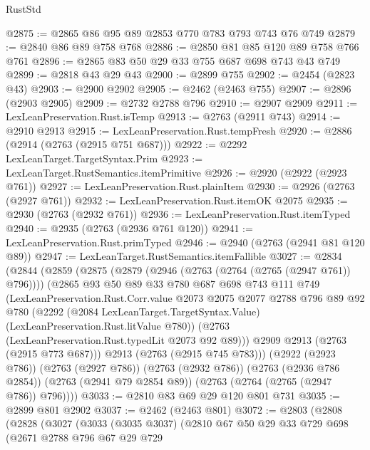 \begin{lexlean}{RustStd}
\begin{coremodule}
@2875 := @2865 @86 @95 @89 @2853 @770 @783 @793 @743 @76 @749
@2879 := @2840 @86 @89 @758 @768
@2886 := @2850 @81 @85 @120 @89 @758 @766 @761
@2896 := @2865 @83 @50 @29 @33 @755 @687 @698 @743 @43 @749
@2899 := @2818 @43 @29 @43
@2900 := @2899 @755
@2902 := @2454 (@2823 @43)
@2903 := @2900 @2902
@2905 := @2462 (@2463 @755)
@2907 := @2896 (@2903 @2905)
@2909 := @2732 @2788 @796
@2910 := @2907 @2909
@2911 := LexLeanPreservation.Rust.isTemp
@2913 := @2763 (@2911 @743)
@2914 := @2910 @2913
@2915 := LexLeanPreservation.Rust.tempFresh
@2920 := @2886 (@2914 (@2763 (@2915 @751 @687)))
@2922 := @2292 LexLeanTarget.TargetSyntax.Prim
@2923 := LexLeanTarget.RustSemantics.itemPrimitive
@2926 := @2920 (@2922 (@2923 @761))
@2927 := LexLeanPreservation.Rust.plainItem
@2930 := @2926 (@2763 (@2927 @761))
@2932 := LexLeanPreservation.Rust.itemOK @2075
@2935 := @2930 (@2763 (@2932 @761))
@2936 := LexLeanPreservation.Rust.itemTyped
@2940 := @2935 (@2763 (@2936 @761 @120))
@2941 := LexLeanPreservation.Rust.primTyped
@2946 := @2940 (@2763 (@2941 @81 @120 @89))
@2947 := LexLeanTarget.RustSemantics.itemFallible
@3027 := @2834
    (@2844
      (@2859
        (@2875
          (@2879 (@2946 (@2763 (@2764 (@2765 (@2947 @761)) @796))))
          (@2865
            @93
            @50
            @89
            @33
            @780
            @687
            @698
            @743
            @111
            @749
            (LexLeanPreservation.Rust.Corr.value
              @2073
              @2075
              @2077
              @2788
              @796
              @89
              @92
              @780
              (@2292
                (@2084 LexLeanTarget.TargetSyntax.Value)
                (LexLeanPreservation.Rust.litValue @780))
              (@2763 (LexLeanPreservation.Rust.typedLit @2073 @92 @89)))
            @2909
            @2913
            (@2763 (@2915 @773 @687)))
          @2913
          (@2763 (@2915 @745 @783)))
        (@2922 (@2923 @786))
        (@2763 (@2927 @786))
        (@2763 (@2932 @786))
        (@2763 (@2936 @786 @2854))
        (@2763 (@2941 @79 @2854 @89))
        (@2763 (@2764 (@2765 (@2947 @786)) @796))))
@3033 := @2810 @83 @69 @29 @120 @801 @731
@3035 := @2899 @801 @2902
@3037 := @2462 (@2463 @801)
@3072 := @2803
    (@2808
      (@2828
        (@3027
          (@3033
            (@3035 @3037)
            (@2810
              @67
              @50
              @29
              @33
              @729
              @698
              (@2671
                @2788
                @796
                @67
                @29
                @729

\end{coremodule}
\end{lexlean}
